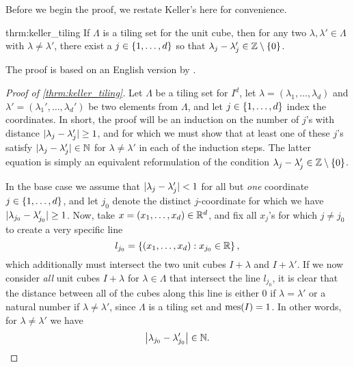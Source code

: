 \documentclass[../thesis.tex]{subfiles}
\begin{document}
Before we begin the proof, we restate Keller's  here for convenience. 
\begin{reptheorem}{thrm:keller_tiling}
    If $\Lambda$ is a tiling set for the unit cube, then for any two $\lambda, \lambda' \in \Lambda$ with $\lambda\neq\lambda'$, there exist a $j\in \{1,\dots,d\}$ so that $\lambda_j-\lambda_j' \in \mathbb{Z}\setminus\{0\}$.
\end{reptheorem}

The proof is based on an English version by \cite{iosevichSpectralTilingProperties1998}.

\begin{proof}[Proof of \cref{thrm:keller_tiling}]
    Let $\Lambda$ be a tiling set for $I^d$, let $\lambda = (\lambda_1,\dots,\lambda_d)$ and $\lambda' = (\lambda_1',\dots,\lambda_d')$ be two elements from $\Lambda$, and let $j\in\{1,\dots, d\}$ index the coordinates. In short, the proof will be an induction on the number of $j$'s with distance $|\lambda_j-\lambda_j'|\geq 1$, and for which we must show that at least one of these $j$'s satisfy $|\lambda_{j}-\lambda_{j}'| \in \mathbb{N}$ for $\lambda \neq \lambda'$ in each of the induction steps. The latter equation is simply an equivalent reformulation of the condition $\lambda_{j}-\lambda_{j}' \in \mathbb{Z}\setminus\{0\}$.

    In the base case we assume that $|\lambda_j-\lambda_j' |< 1 $ for all but \emph{one} coordinate $j\in \{1,\dots,d\}$, and let $j_0$ denote the distinct $j$-coordinate for which we have $|\lambda_{j_0}-\lambda_{j_0}'| \geq 1$. Now, take $x=(x_1,\dots,x_d)\in \mathbb{R}^d$, and fix all $x_j$'s for which $j\neq j_0$ to create a very specific line
    \begin{equation*}
        l_{j_0} = \left\{\left(x_1,\dots,x_d\right) : x_{j_0} \in \mathbb{R} \right\},
    \end{equation*}
    which additionally must intersect the two unit cubes $I+\lambda$ and $I+\lambda'$. If we now consider \emph{all} unit cubes $I+\lambda$ for $\lambda \in \Lambda$ that intersect the line $l_{j_0}$, it is clear that the distance between all of the cubes along this line is either $0$ if $\lambda=\lambda'$ or a natural number if $\lambda \neq \lambda'$, since $\Lambda$ is a tiling set and $\operatorname{mes}(I)=1$. In other words, for $\lambda \neq \lambda'$ we have
    \begin{equation*}
        \left|\lambda_{j_0}-\lambda_{j_0}'\right| \in \mathbb{N}.
    \end{equation*}


\end{proof}
\end{document}
